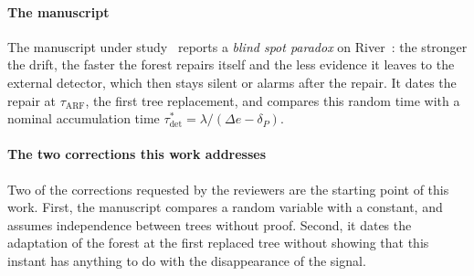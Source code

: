 \documentclass[10pt,conference]{IEEEtran}
\theoremstyle{definition}
\begin{document}
\paragraph*{The manuscript} The manuscript under study~\cite{blindspot2026} reports a
\emph{blind spot paradox} on River~\cite{montiel2021}: the stronger the drift, the faster
the forest repairs itself and the less evidence it leaves to the external detector, which
then stays silent or alarms after the repair. It dates the repair at
$\tau_{\mathrm{ARF}}$, the first tree replacement, and compares this random time with a
nominal accumulation time $\tau^*_{\mathrm{det}} = \lambda/(\Delta e - \delta_P)$.

\paragraph*{The two corrections this work addresses} Two of the corrections requested by
the reviewers are the starting point of this work. First, the manuscript compares a random variable
with a constant, and assumes independence between trees without proof.
Second, it dates the adaptation of the forest at the first replaced tree without showing
that this instant has anything to do with the disappearance of the signal.
\end{document}
